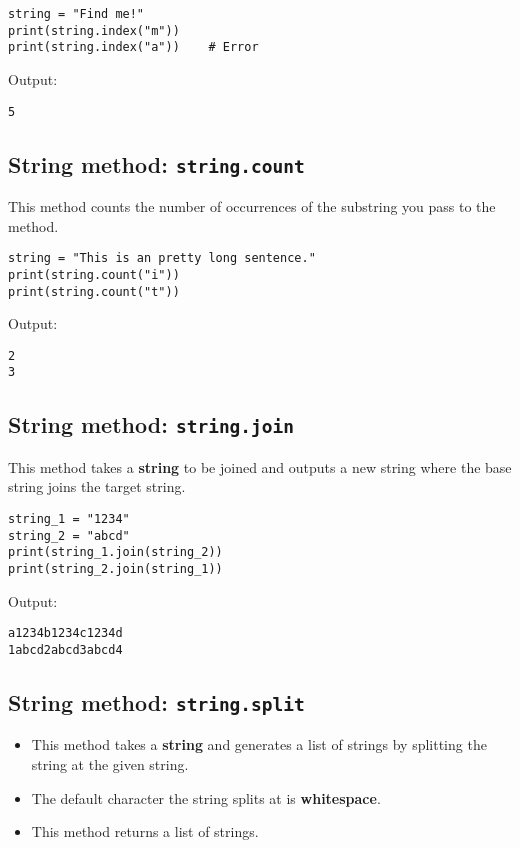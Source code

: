 \documentclass[11pt]{article}
\begin{document}
\begin{verbatim}
string = "Find me!"
print(string.index("m"))
print(string.index("a"))    # Error
\end{verbatim}

 \noindent Output:

\label{org945006c}
\begin{verbatim}
5
\end{verbatim}
\subsection{String method: \texttt{string.count}}
\label{sec:org0409924}
This method counts the number of occurrences of the substring you pass to the method.

\begin{verbatim}
string = "This is an pretty long sentence."
print(string.count("i"))
print(string.count("t"))
\end{verbatim}

 \noindent Output:

\label{orgb66e9f0}
\begin{verbatim}
2
3
\end{verbatim}


 \newpage
\subsection{String method: \texttt{string.join}}
\label{sec:org59bc921}
This method takes a \textbf{string} to be joined and outputs a new string where the base string joins the target string.

\begin{verbatim}
string_1 = "1234"
string_2 = "abcd"
print(string_1.join(string_2))
print(string_2.join(string_1))
\end{verbatim}

 \noindent Output:

\label{orgf08ef7f}
\begin{verbatim}
a1234b1234c1234d
1abcd2abcd3abcd4
\end{verbatim}
\subsection{String method: \texttt{string.split}}
\label{sec:org3d69eab}
\begin{itemize}
\item This method takes a \textbf{string} and generates a list of strings by splitting the string at the given string.
\item The default character the string splits at is \textbf{whitespace}.
\item This method returns a list of strings.
\end{itemize}
\end{document}
